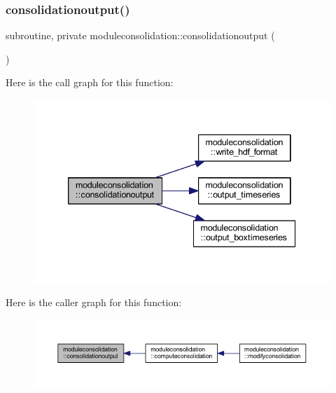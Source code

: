 \subsubsection{\texorpdfstring{consolidationoutput()}{consolidationoutput()}}
{\footnotesize\ttfamily subroutine, private moduleconsolidation\+::consolidationoutput (\begin{DoxyParamCaption}{ }\end{DoxyParamCaption})\hspace{0.3cm}{\ttfamily [private]}}

Here is the call graph for this function\+:\nopagebreak
\begin{figure}[H]
\begin{center}
\leavevmode
\includegraphics[width=339pt]{namespacemoduleconsolidation_ade260a3416dd427c11f719144f5eb362_cgraph}
\end{center}
\end{figure}
Here is the caller graph for this function\+:\nopagebreak
\begin{figure}[H]
\begin{center}
\leavevmode
\includegraphics[width=350pt]{namespacemoduleconsolidation_ade260a3416dd427c11f719144f5eb362_icgraph}
\end{center}
\end{figure}
\mbox{\label{namespacemoduleconsolidation_a37594ccd5d2f08cccc42657f65ec2387}} 
